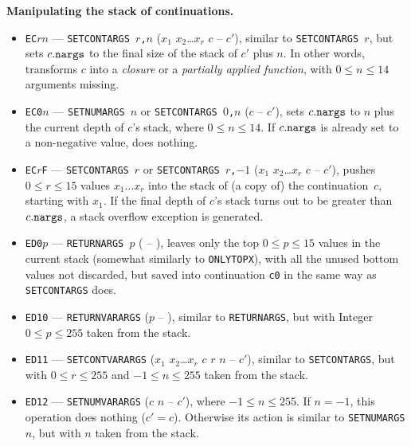 \documentclass[12pt,oneside]{article}
\def\makepoint#1{\medbreak\noindent{\bf #1.\ }}
\def\nxsubpoint{\refstepcounter{subsubsection}%
  \smallbreak\makepoint{\thesubsubsection}}
\def\emb#1{\textbf{#1.}}
\begin{document}
\nxsubpoint\label{sp:cont.stk.manip}\emb{Manipulating the stack of continuations}
\begin{itemize}
\item {\tt EC$rn$} --- {\tt SETCONTARGS $r$,$n$} ($x_1$ $x_2$\dots$x_r$ $c$ -- $c'$), similar to {\tt SETCONTARGS $r$}, but sets $c.{\tt nargs}$ to the final size of the stack of $c'$ plus $n$. In other words, transforms $c$ into a {\em closure\/} or a {\em partially applied function}, with $0\leq n\leq 14$ arguments missing.
\item {\tt EC0$n$} --- {\tt SETNUMARGS $n$} or {\tt SETCONTARGS $0$,$n$} ($c$ -- $c'$), sets $c.{\tt nargs}$ to $n$ plus the current depth of $c$'s stack, where $0\leq n\leq 14$. If $c.{\tt nargs}$ is already set to a non-negative value, does nothing.
\item {\tt EC$r$F} --- {\tt SETCONTARGS $r$} or {\tt SETCONTARGS $r$,$-1$} ($x_1$ $x_2$\dots$x_r$ $c$ -- $c'$), pushes $0\leq r\leq 15$ values $x_1\ldots x_r$ into the stack of (a copy of) the continuation~$c$, starting with $x_1$. If the final depth of $c$'s stack turns out to be greater than $c.{\tt nargs}$, a stack overflow exception is generated.
\item {\tt ED0$p$} --- {\tt RETURNARGS $p$} ( -- ), leaves only the top $0\leq p\leq 15$ values in the current stack (somewhat similarly to {\tt ONLYTOPX}), with all the unused bottom values not discarded, but saved into continuation {\tt c0} in the same way as {\tt SETCONTARGS} does.
\item {\tt ED10} --- {\tt RETURNVARARGS} ($p$ -- ), similar to {\tt RETURNARGS}, but with Integer $0\leq p\leq 255$ taken from the stack.
\item {\tt ED11} --- {\tt SETCONTVARARGS} ($x_1$ $x_2$\dots$x_r$ $c$ $r$ $n$ -- $c'$), similar to {\tt SETCONTARGS}, but with $0\leq r\leq 255$ and $-1\leq n\leq 255$ taken from the stack.
\item {\tt ED12} --- {\tt SETNUMVARARGS} ($c$ $n$ -- $c'$), where $-1\leq n\leq 255$. If $n=-1$, this operation does nothing ($c'=c$). Otherwise its action is similar to {\tt SETNUMARGS $n$}, but with $n$ taken from the stack.
\end{itemize}
\end{document}
